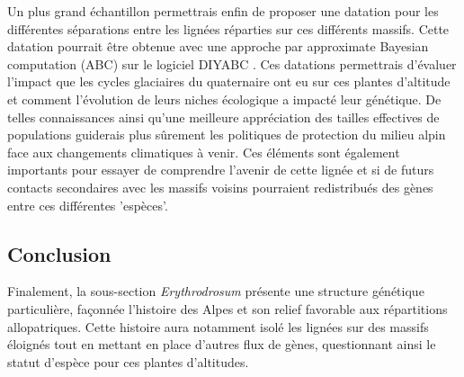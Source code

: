 Un plus grand échantillon permettrais enfin de proposer une datation pour les différentes séparations entre les lignées réparties sur ces différents massifs. Cette datation pourrait être obtenue avec une approche par approximate Bayesian computation (ABC) sur le logiciel DIYABC \citep{Cornuet2014}. Ces datations permettrais d'évaluer l'impact que les cycles glaciaires du quaternaire ont eu sur ces plantes d'altitude et comment l'évolution de leurs niches écologique a impacté leur génétique. De telles connaissances ainsi qu'une meilleure appréciation des tailles effectives de populations guiderais plus sûrement les politiques de protection du milieu alpin face aux changements climatiques à venir. Ces éléments sont également importants pour essayer de comprendre l'avenir de cette lignée et si de futurs contacts secondaires avec les massifs voisins pourraient redistribués des gènes entre ces différentes 'espèces'.

\subsection{Conclusion}

Finalement, la sous-section \textit{Erythrodrosum} présente une structure génétique particulière, façonnée l'histoire des Alpes et son relief favorable aux répartitions allopatriques. Cette histoire aura notamment isolé les lignées sur des massifs éloignés tout en mettant en place d'autres flux de gènes, questionnant ainsi le statut d'espèce pour ces plantes d'altitudes.
